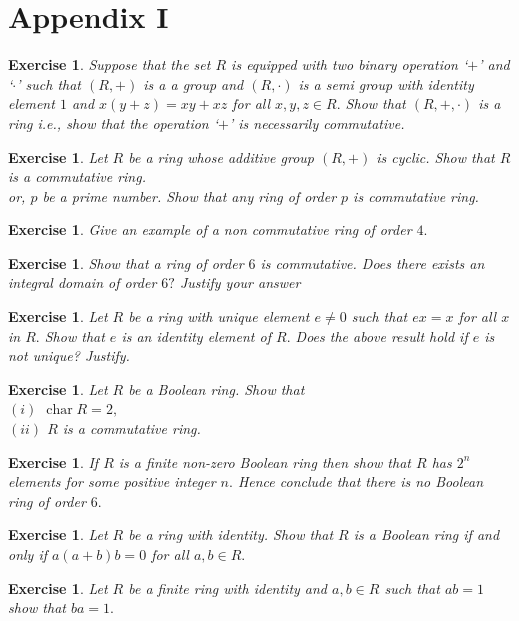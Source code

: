 \documentclass[11pt]{amsart}
\newtheorem{ex}[theorem]{Exercise}
\DeclareMathOperator{\ch}{\text{char}}
\begin{document}
\newpage
\section{Appendix I}

\begin{ex}
Suppose that the set $R$ is equipped with two binary operation `$+$' and `$\cdot$' such  that $(R,+)$ is a a group and $(R,\cdot)$ is a semi group with identity element $1$ and $x(y+z)=xy+xz$ for all $x,y,z\in R.$ Show that $(R,+,\cdot)$ is a ring i.e., show that the operation `$+$' is necessarily commutative.
\end{ex}
\begin{ex}
Let $R$ be a ring whose additive group $(R,+)$ is cyclic. Show that $R$ is a commutative ring.\\
or, $p$ be a prime number. Show that any ring of order $p$ is commutative ring.
\end{ex}
\begin{ex}
Give an example of  a non commutative ring of order $4.$
\end{ex}
\begin{ex}
Show that a ring of order $6$ is commutative. Does there exists an integral domain of order $6?$ Justify your answer
\end{ex}
\begin{ex}
Let $R$ be a ring with unique element $e\neq 0$ such that $ex=x$ for all $x$ in $R.$ Show that $e$ is an identity element of $R.$ Does the above result hold if $e$ is not unique? Justify.
\end{ex}
\begin{ex}
Let $R$ be a Boolean ring. Show that \\
$(i)$ $\ch R=2,$\\
$(ii)$ $R$ is a commutative ring. 
\end{ex}
\begin{ex}
If $R$ is a finite non-zero Boolean ring then show that $R$ has $2^n$ elements for some positive integer $n.$ Hence conclude that there is no Boolean ring of order $6.$
\end{ex}
\begin{ex}
Let $R$ be a ring with identity. Show that $R$ is a Boolean ring if and only if $a(a+b)b=0$ for all $a,b\in R.$
\end{ex}
\begin{ex}
Let $R$ be a finite ring with identity and $a,b\in R$ such that $ab=1$ show that $ba=1.$
\end{ex}
\end{document}
